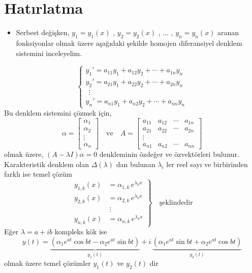 \documentclass[11pt,a4paper]{article}
\begin{document}

\hfill{}
\section{Hatırlatma}
\begin{itemize}[label=$\ast$]
\item Serbest değişken, $y_1 = y_1(x)$ , $y_2 = y_2(x)$ , $\ldots$ , $y_n = y_n(x)$ aranan fonksiyonlar olmak üzere aşağıdaki şekilde homojen diferansiyel denklem sistemini inceleyelim.
\end{itemize}
\[
\begin{cases}
y_1' = a_{11}y_1 + a_{12}y_2 + \cdots + a_{1n}y_n \\
y_2' = a_{21}y_1 + a_{22}y_2 + \cdots + a_{2n}y_n \\
\ \ \vdots \\
y_n' = a_{n1}y_1 + a_{n2}y_2 + \cdots + a_{nn}y_n
\end{cases}
\]
Bu denklem sistemini çözmek için,
\[
\alpha = \begin{bmatrix} \alpha_1 \\ \alpha_2 \\ \vdots \\ \alpha_n \end{bmatrix}
\quad \text{ve} \quad
A = \begin{bmatrix} a_{11} & a_{12} & \cdots & a_{1n} \\ a_{21} & a_{22} & \cdots & a_{2n} \\ \vdots & & & \\ a_{n1} & a_{n2} & \cdots & a_{nn} \end{bmatrix}
\]
olmak üzere, $(A-\lambda I)\alpha = 0$ denkleminin özdeğer ve özvektörleri bulunur. Karakteristik denklem olan $\Delta(\lambda)$ dan bulunan $\lambda_i$ ler reel sayı ve birbirinden farklı ise temel çözüm
\[
\left.
\begin{aligned}
y_{1,k}(x) &= \alpha_{1,k}\,e^{\lambda_k x} \\
y_{2,k}(x) &= \alpha_{2,k}\,e^{\lambda_k x} \\
&\ \vdots \\
y_{n,k}(x) &= \alpha_{n,k}\,e^{\lambda_k x}
\end{aligned}
\right\}
\quad \text{şeklindedir}
\]
Eğer $\lambda = a+ib$ kompleks kök ise
\[
y(t) = \underbrace{\left(\alpha_1 e^{at}\cos bt - \alpha_2 e^{at}\sin bt\right)}_{y_1(t)} + i\,\underbrace{\left(\alpha_1 e^{at}\sin bt + \alpha_2 e^{at}\cos bt\right)}_{y_2(t)}
\]
olmak üzere temel çözümler $y_1(t)$ ve $y_2(t)$ dir
\end{document}
